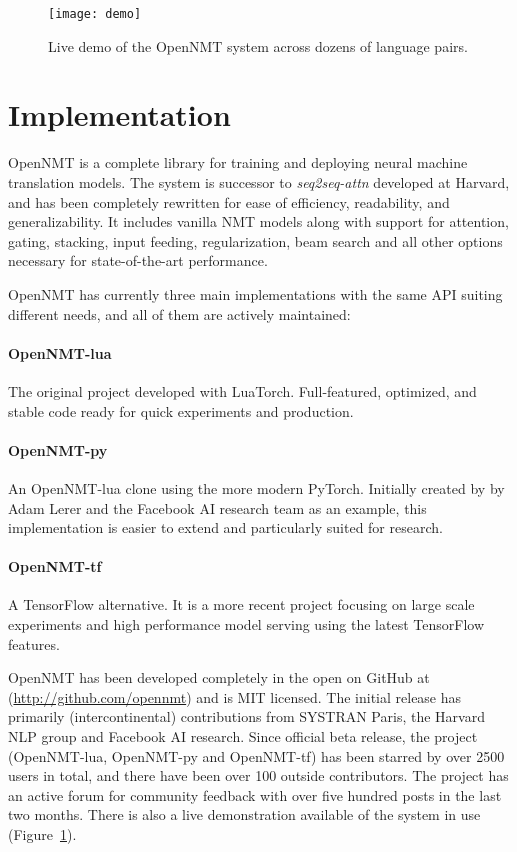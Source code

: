 \documentclass[]{article}
\begin{document}
\begin{figure}
  \centering
  \texttt{[image: demo]}
  \label{fig:live}
  \caption{\small Live demo of the OpenNMT system across dozens of language pairs.}
\end{figure}
\section{Implementation}

OpenNMT is a complete library for training and deploying neural
machine translation models. The system is successor to
\textit{seq2seq-attn} developed at Harvard, and has been completely
rewritten for ease of efficiency, readability, and
generalizability. It includes vanilla NMT models along with support
for attention, gating, stacking, input feeding, regularization, beam
search and all other options necessary for state-of-the-art
performance.  

OpenNMT has currently three main implementations with the same API suiting different needs, and all of them are actively maintained:

\paragraph{OpenNMT-lua} The original project developed with LuaTorch.
    Full-featured, optimized, and stable code ready for quick experiments and production.
\paragraph{OpenNMT-py} An OpenNMT-lua clone using the more modern PyTorch.
    Initially created by by Adam
Lerer and the Facebook AI research team as an example, this implementation is easier to extend and particularly suited for research.
\paragraph{OpenNMT-tf} A TensorFlow alternative.
    It is a more recent project focusing on large scale experiments and high performance model serving using the latest TensorFlow features.





OpenNMT has been developed completely in the open on GitHub at
(\url{http://github.com/opennmt}) and is MIT licensed.  The
initial release has primarily (intercontinental) contributions from
SYSTRAN Paris, the Harvard NLP group and Facebook AI research. Since official beta release,
the project (OpenNMT-lua, OpenNMT-py and OpenNMT-tf) has been starred by over 2500 users in total, and there have been
over 100 outside contributors. The
project has an active forum for community feedback with over five
hundred posts in the last two months. There is also a live
demonstration available of the system in use (Figure~\ref{fig:live}).
\end{document}
